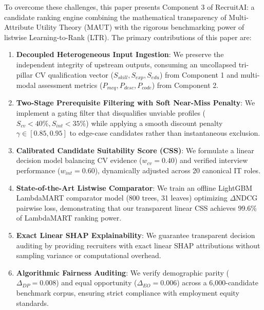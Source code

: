 \documentclass[conference]{IEEEtran}
\begin{document}
To overcome these challenges, this paper presents Component 3 of RecruitAI: a candidate ranking engine combining the mathematical transparency of Multi-Attribute Utility Theory (MAUT) with the rigorous benchmarking power of listwise Learning-to-Rank (LTR). The primary contributions of this paper are:
\begin{enumerate}
    \item \textbf{Decoupled Heterogeneous Input Ingestion}: We preserve the independent integrity of upstream outputs, consuming an uncollapsed tri-pillar CV qualification vector ($S_{skill}, S_{exp}, S_{edu}$) from Component 1 and multi-modal assessment metrics ($P_{mcq}, P_{desc}, P_{code}$) from Component 2.
    \item \textbf{Two-Stage Prerequisite Filtering with Soft Near-Miss Penalty}: We implement a gating filter that disqualifies unviable profiles ($S_{cv} < 40\%, S_{int} < 35\%$) while applying a smooth discount penalty $\gamma \in [0.85, 0.95]$ to edge-case candidates rather than instantaneous exclusion.
    \item \textbf{Calibrated Candidate Suitability Score (CSS)}: We formulate a linear decision model balancing CV evidence ($w_{cv} = 0.40$) and verified interview performance ($w_{int} = 0.60$), dynamically adjusted across 20 canonical IT roles.
    \item \textbf{State-of-the-Art Listwise Comparator}: We train an offline LightGBM LambdaMART comparator model (800 trees, 31 leaves) optimizing $\Delta\text{NDCG}$ pairwise loss, demonstrating that our transparent linear CSS achieves 99.6\% of LambdaMART ranking power.
    \item \textbf{Exact Linear SHAP Explainability}: We guarantee transparent decision auditing by providing recruiters with exact linear SHAP attributions without sampling variance or computational overhead.
    \item \textbf{Algorithmic Fairness Auditing}: We verify demographic parity ($\Delta_{DP} = 0.008$) and equal opportunity ($\Delta_{EO} = 0.006$) across a 6,000-candidate benchmark corpus, ensuring strict compliance with employment equity standards.
\end{enumerate}
\end{document}
